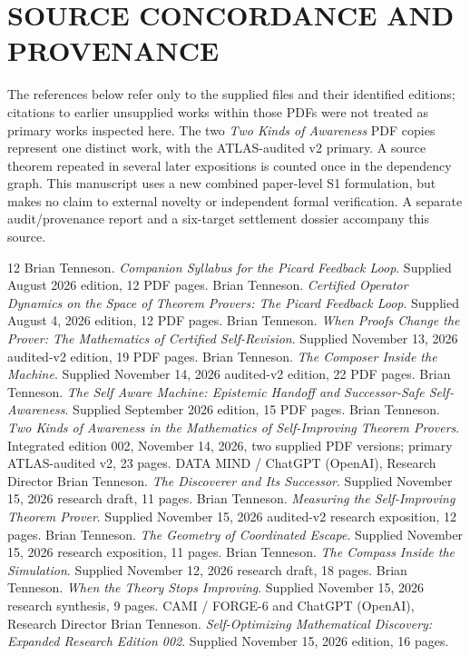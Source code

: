 \documentclass[11pt,letterpaper]{article}
\theoremstyle{definition}
\theoremstyle{remark}
\begin{document}
\section*{SOURCE CONCORDANCE AND PROVENANCE}
The references below refer only to the supplied files and their identified editions; citations to earlier unsupplied works within those PDFs were not treated as primary works inspected here. The two \emph{Two Kinds of Awareness} PDF copies represent one distinct work, with the ATLAS-audited v2 primary. A source theorem repeated in several later expositions is counted once in the dependency graph. This manuscript uses a new combined paper-level S1 formulation, but makes no claim to external novelty or independent formal verification. A separate audit/provenance report and a six-target settlement dossier accompany this source.
\begin{thebibliography}{12}\small
{} Brian Tenneson. \emph{Companion Syllabus for the Picard Feedback Loop}. Supplied August 2026 edition, 12 PDF pages.
 Brian Tenneson. \emph{Certified Operator Dynamics on the Space of Theorem Provers: The Picard Feedback Loop}. Supplied August 4, 2026 edition, 12 PDF pages.
 Brian Tenneson. \emph{When Proofs Change the Prover: The Mathematics of Certified Self-Revision}. Supplied November 13, 2026 audited-v2 edition, 19 PDF pages.
 Brian Tenneson. \emph{The Composer Inside the Machine}. Supplied November 14, 2026 audited-v2 edition, 22 PDF pages.
 Brian Tenneson. \emph{The Self Aware Machine: Epistemic Handoff and Successor-Safe Self-Awareness}. Supplied September 2026 edition, 15 PDF pages.
 Brian Tenneson. \emph{Two Kinds of Awareness in the Mathematics of Self-Improving Theorem Provers}. Integrated edition 002, November 14, 2026, two supplied PDF versions; primary ATLAS-audited v2, 23 pages.
 DATA MIND / ChatGPT (OpenAI), Research Director Brian Tenneson. \emph{The Discoverer and Its Successor}. Supplied November 15, 2026 research draft, 11 pages.
 Brian Tenneson. \emph{Measuring the Self-Improving Theorem Prover}. Supplied November 15, 2026 audited-v2 research exposition, 12 pages.
 Brian Tenneson. \emph{The Geometry of Coordinated Escape}. Supplied November 15, 2026 research exposition, 11 pages.
 Brian Tenneson. \emph{The Compass Inside the Simulation}. Supplied November 12, 2026 research draft, 18 pages.
 Brian Tenneson. \emph{When the Theory Stops Improving}. Supplied November 15, 2026 research synthesis, 9 pages.
 CAMI / FORGE-6 and ChatGPT (OpenAI), Research Director Brian Tenneson. \emph{Self-Optimizing Mathematical Discovery: Expanded Research Edition 002}. Supplied November 15, 2026 edition, 16 pages.
\end{thebibliography}
\end{document}
